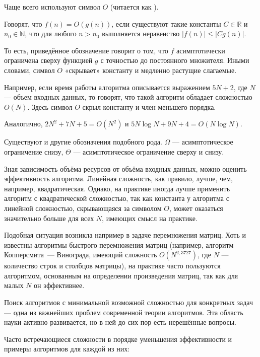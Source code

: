 Чаще всего используют символ $O$ (читается как ).

\begin{defn}
  Говорят, что $f(n)=O(g(n))$, если существуют такие константы
  $C\in\mathbb{R}$ и $n_{0}\in\mathbb{N}$, что для любого $n>n_{0}$
  выполняется неравенство $|f(n)|\leqslant|Cg(n)|$.
\end{defn}

То есть, приведённое обозначение говорит о том, что $f$ асимптотически
ограничена сверху функцией $g$ с точностью до постоянного
множителя. Иными словами, символ $O$ «скрывает» константу и медленно
растущие слагаемые.

Например, если время работы алгоритма описывается выражением $5N+2$,
где $N$ — объем входных данных, то говорят, что такой алгоритм
обладает сложностью $O(N)$. Здесь символ $O$ скрыл константу и член
меньшего порядка.

Аналогично, $2N^2+7N+5 = O(N^2)$ и $5N\log N + 9N + 4 = O(N\log N)$.

Существуют и другие обозначения подобного рода. $\Omega$ —
асимптотическое ограничение снизу, $\Theta$ — асимптотическое
ограничение сверху и снизу.

Зная зависимость объёма ресурсов от объёма входных данных, можно
оценить эффективность алгоритма. Линейная сложность, как правило,
лучше, чем, например, квадратическая.  Однако, на практике иногда
лучше применить алгоритм с квадратической сложностью, так как
константа у алгоритма с линейной сложностью, скрывающаяся за символом
$O$, может оказаться значительно больше для всех $N$, имеющих смысл на
практике.

Подобная ситуация возникла например в задаче перемножения матриц. Хоть
и известны алгоритмы быстрого перемножения матриц (например, алгоритм
Копперсмита~— Винограда, имеющий сложность $O(N^{2{,}3727})$, где $N$
— количество строк и столбцов матрицы), на практике часто пользуются
алгоритмом, основанным на определении произведения матриц, так как для
малых $N$ он эффективнее.

Поиск алгоритмов с минимальной возможной сложностью для конкретных
задач — одна из важнейших проблем современной теории алгоритмов. Эта
область науки активно развивается, но в ней до сих пор есть нерешённые
вопросы.


Часто встречающиеся сложности в порядке уменьшения эффективности и
примеры алгоритмов для каждой из них:

